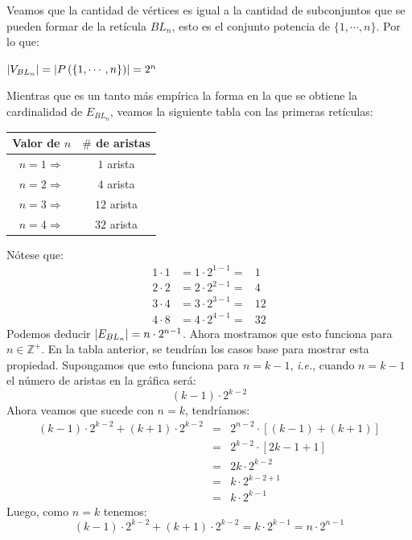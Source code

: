 \documentclass{article}
\begin{document}
\begin{enumerate}
\begin{enumerate}
    Veamos que la cantidad de vértices es igual a la
    cantidad de subconjuntos que se pueden formar de
    la retícula $BL_n$, esto es el conjunto potencia
    de $\{1, \dotsm, n\}$. Por lo que:
    \begin{center}
      $\abs{V_{BL_n}} = \abs{P \left(\{1, \dotsm, n\}\right)} = 2^{n}$
    \end{center}
    Mientras que es un tanto más empírica la forma en
    la que se obtiene la cardinalidad de $E_{BL_n}$,
    veamos la siguiente tabla con las primeras retículas:
    \begin{center}
      \begin{tabular}{|c|c|}
        \hline
        Valor de $n$ & $\#$ de aristas \\
        \hline
        $n = 1 \Rightarrow$ & $1$ arista \\
        \hline
        $n = 2 \Rightarrow$ & $4$ arista \\
        \hline
        $n = 3 \Rightarrow$ & $12$ arista \\
        \hline
        $n = 4 \Rightarrow$ & $32$ arista \\
        \hline
      \end{tabular}
    \end{center}
    Nótese que:
    \begin{eqnarray*}
      1 \cdot 1 &= 1 \cdot 2^{1-1} =& 1\\
      2 \cdot 2 &= 2 \cdot 2^{2-1} =& 4\\
      3 \cdot 4 &= 3 \cdot 2^{3-1} =& 12\\
      4 \cdot 8 &= 4 \cdot 2^{4-1} =& 32
    \end{eqnarray*}
    Podemos deducir $\abs{E_{BL_n}} = n \cdot 2^{n-1}$.
    Ahora mostramos que esto funciona para
    $n \in \mathbb{Z}^{+}$. En la tabla anterior, se
    tendrían los casos base para mostrar esta propiedad.
    Supongamos que esto funciona para $n = k -1$,
    \textit{i.e.}, cuando $n = k-1$ el número de aristas
    en la gráfica será:
    \[
    (k -1) \cdot 2^{k -2}
    \]
    Ahora veamos que sucede con $n = k$, tendríamos:
    \begin{eqnarray*}
      (k -1) \cdot 2^{k -2} + (k +1) \cdot 2^{k -2} &=&
      2^{n -2} \cdot [(k -1) + (k +1)]\\
      &=& 2^{k -2} \cdot [2k -1 +1]\\
      &=& 2k \cdot 2^{k -2}\\
      &=& k \cdot 2^{k -2 + 1}\\
      &=& k \cdot 2^{k -1}
    \end{eqnarray*}
    Luego, como $n = k$ tenemos:
    \[
    (k -1) \cdot 2^{k -2} + (k +1) \cdot 2^{k -2} =
    k \cdot 2^{k -1} = n \cdot 2^{n -1}
    \]
    

\end{enumerate}
\end{enumerate}
\end{document}
